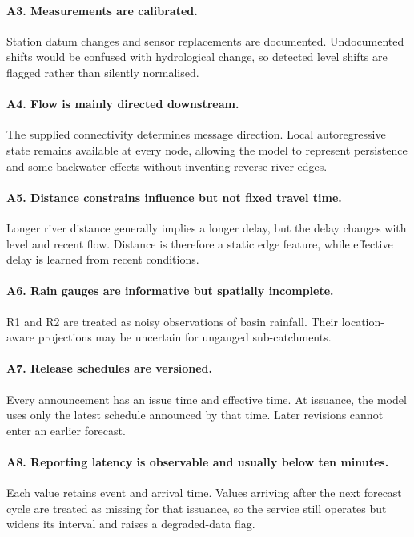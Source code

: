 \documentclass{article}
\begin{document}
\paragraph{A3. Measurements are calibrated.}
Station datum changes and sensor replacements are documented. Undocumented shifts would be confused with hydrological change, so detected level shifts are flagged rather than silently normalised.

\paragraph{A4. Flow is mainly directed downstream.}
The supplied connectivity determines message direction. Local autoregressive state remains available at every node, allowing the model to represent persistence and some backwater effects without inventing reverse river edges.

\paragraph{A5. Distance constrains influence but not fixed travel time.}
Longer river distance generally implies a longer delay, but the delay changes with level and recent flow. Distance is therefore a static edge feature, while effective delay is learned from recent conditions.

\paragraph{A6. Rain gauges are informative but spatially incomplete.}
R1 and R2 are treated as noisy observations of basin rainfall. Their location-aware projections may be uncertain for ungauged sub-catchments.

\paragraph{A7. Release schedules are versioned.}
Every announcement has an issue time and effective time. At issuance, the model uses only the latest schedule announced by that time. Later revisions cannot enter an earlier forecast.

\paragraph{A8. Reporting latency is observable and usually below ten minutes.}
Each value retains event and arrival time. Values arriving after the next forecast cycle are treated as missing for that issuance, so the service still operates but widens its interval and raises a degraded-data flag.
\end{document}
